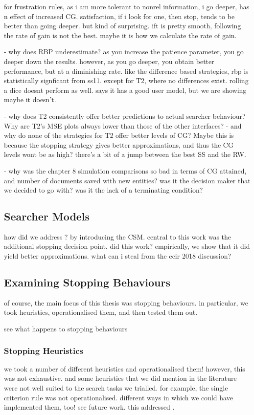 for frustration rules, as i am more tolerant to nonrel information, i go deeper, has n effect of increased CG.
satisfaction, if i look for one, then stop, tends to be better than going deeper. but kind of surprising.
ift is pretty smooth, following the rate of gain is not the best. maybe it is how we calculate the rate of gain.

- why does RBP underestimate? as you increase the patience parameter, you go deeper down the results. however, as you go deeper, you obtain better performance, but at a diminishing rate. like the difference based strategies, rbp is statistically signficant from ss11. except for T2, where no differences exist. rolling a dice doesnt perform as well. says it has a good user model, but we are showing maybe it doesn't.

- why does T2 consistently offer better predictions to actual searcher behaviour? Why are T2's MSE plots always lower than those of the other interfaces?
    - and why do none of the strategies for T2 offer better levels of CG? Maybe this is because the stopping strategy gives better approximations, and thus the CG levels wont be as high? there's a bit of a jump between the best SS and the RW.

- why was the chapter 8 simulation comparisons so bad in terms of CG attained, and number of documents saved with new entities? was it the decision maker that we decided to go with? was it the lack of a terminating condition?

\subsection{Searcher Models}

how did we address ? by introducing the CSM.
central to this work was the additional stopping decision point.
did this work?
empirically, we show that it did yield better approximations.
what can i steal from the ecir 2018 discussion?

\subsection{Examining Stopping Behaviours}

of course, the main focus of this thesis was stopping behaviours.
in particular, we took heuristics, operationalised them, and then tested them out.

see what happens to stopping behaviours 

\subsubsection{Stopping Heuristics}
we took a number of different heuristics and operationalised them!
however, this was not exhaustive.
and some heuristics that we did mention in the literature were not well suited to the search tasks we trialled.
for example, the single criterion rule was not operationalised.
different ways in which we could have implemented them, too! see future work.
this addressed .


